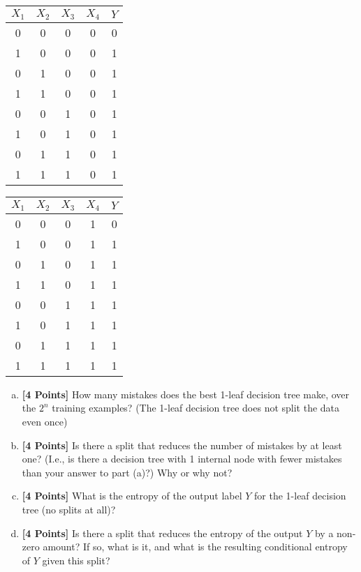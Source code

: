 \documentclass{article}
\begin{document}
\begin{center}
  \begin{tabular}{cccc|c}
    $X_1$ & $X_2$ & $X_3$ & $X_4$ & $Y$ \\
    \hline
    0 & 0 & 0 & 0 & 0 \\
    1 & 0 & 0 & 0 & 1 \\
    0 & 1 & 0 & 0 & 1 \\
    1 & 1 & 0 & 0 & 1 \\
    0 & 0 & 1 & 0 & 1 \\
    1 & 0 & 1 & 0 & 1 \\
    0 & 1 & 1 & 0 & 1 \\
    1 & 1 & 1 & 0 & 1 \\
  \end{tabular}
  \hspace{3cm}
  \begin{tabular}{cccc|c}
    $X_1$ & $X_2$ & $X_3$ & $X_4$ & $Y$ \\
    \hline
    0 & 0 & 0 & 1 & 0 \\
    1 & 0 & 0 & 1 & 1 \\
    0 & 1 & 0 & 1 & 1 \\
    1 & 1 & 0 & 1 & 1 \\
    0 & 0 & 1 & 1 & 1 \\
    1 & 0 & 1 & 1 & 1 \\
    0 & 1 & 1 & 1 & 1 \\
    1 & 1 & 1 & 1 & 1 \\
  \end{tabular}
\end{center}

\begin{enumerate}[(a)]
\item {\bf [4 Points]} How many mistakes does the best 1-leaf decision
  tree make, over the $2^n$ training examples? (The 1-leaf decision
  tree does not split the data even once)

\item {\bf [4 Points]} Is there a split that reduces the number of
  mistakes by at least one?  (I.e., is there a decision tree with 1
  internal node with fewer mistakes than your answer to part (a)?)
  Why or why not?

\item {\bf [4 Points]} What is the entropy of the output label $Y$ for
  the 1-leaf decision tree (no splits at all)?

\item {\bf [4 Points]} Is there a split that reduces the entropy of
  the output $Y$ by a non-zero amount?  If so, what is it, and what is
  the resulting conditional entropy of $Y$ given this split?

\end{enumerate}
\end{document}
